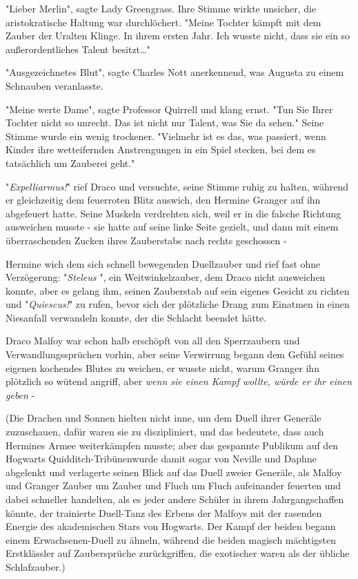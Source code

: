 {"Lieber Merlin", sagte Lady Greengrass. Ihre Stimme wirkte unsicher, die aristokratische Haltung war durchlöchert. "Meine Tochter kämpft mit dem Zauber der Uralten Klinge. In ihrem ersten Jahr. Ich wusste nicht, dass sie ein so außerordentliches Talent besitzt…"

"Ausgezeichnetes Blut", sagte Charles Nott anerkennend, was Augusta zu einem Schnauben veranlasste.

"Meine werte Dame", sagte Professor Quirrell und klang ernst. "Tun Sie Ihrer Tochter nicht so unrecht. Das ist nicht nur Talent, was Sie da sehen." Seine Stimme wurde ein wenig trockener. "Vielmehr ist es das, was passiert, wenn Kinder ihre wetteifernden Anstrengungen in ein Spiel stecken, bei dem es tatsächlich um Zauberei geht."

"\emph{Expelliarmus!}" rief Draco und versuchte, seine Stimme ruhig zu halten, während er gleichzeitig dem feuerroten Blitz auswich, den Hermine Granger auf ihn abgefeuert hatte. Seine Muskeln verdrehten sich, weil er in die falsche Richtung ausweichen musste - sie hatte auf seine linke Seite gezielt, und dann mit einem überraschenden Zucken ihres Zauberstabs nach rechts geschossen -

Hermine wich dem sich schnell bewegenden Duellzauber und rief fast ohne Verzögerung: "\emph{Steleus} ", ein Weitwinkelzauber, dem Draco nicht ausweichen konnte, aber es gelang ihm, seinen Zauberstab auf sein eigenes Gesicht zu richten und "\emph{Quiescus!}" zu rufen, bevor sich der plötzliche Drang zum Einatmen in einen Niesanfall verwandeln konnte, der die Schlacht beendet hätte.

Draco Malfoy war schon halb erschöpft von all den Sperrzaubern und Verwandlungssprüchen vorhin, aber seine Verwirrung begann dem Gefühl seines eigenen kochendes Blutes zu weichen, er wusste nicht, warum Granger ihn plötzlich so wütend angriff, aber \emph{wenn sie einen Kampf wollte, würde er ihr einen geben} -

(Die Drachen und Sonnen hielten nicht inne, um dem Duell ihrer Generäle zuzuschauen, dafür waren sie zu diszipliniert, und das bedeutete, dass auch Hermines Armee weiterkämpfen musste; aber das gespannte Publikum auf den Hogwarts Quidditch-Tribünenwurde damit sogar von Neville und Daphne abgelenkt und verlagerte seinen Blick auf das Duell zweier Generäle, als Malfoy und Granger Zauber um Zauber und Fluch um Fluch aufeinander feuerten und dabei schneller handelten, als es jeder andere Schüler in ihrem Jahrgangschaffen könnte, der trainierte Duell-Tanz des Erbens der Malfoys mit der rasenden Energie des akademischen Stars von Hogwarts. Der Kampf der beiden begann einem Erwachsenen-Duell zu ähneln, während die beiden magisch mächtigsten Erstklässler auf Zaubersprüche zurückgriffen, die exotischer waren als der übliche Schlafzauber.)

}
